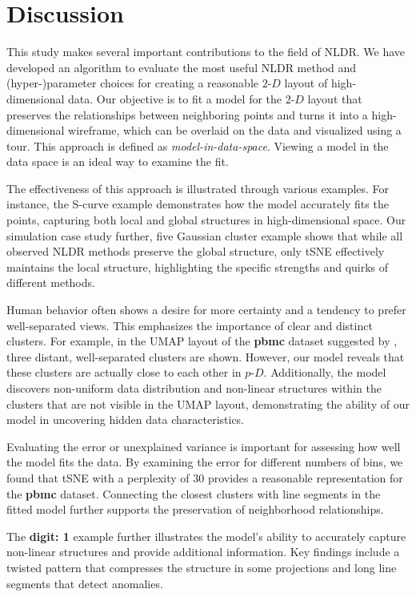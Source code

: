 \documentclass[
  12pt]{article}
\newcommand\pD{$p\text{-}D$}
\newcommand\gD{$2\text{-}D$}
\begin{document}
\section{Discussion}\label{sec-discussion}

This study makes several important contributions to the field of NLDR.
We have developed an algorithm to evaluate the most useful NLDR method
and (hyper-)parameter choices for creating a reasonable \gD{} layout of
high-dimensional data. Our objective is to fit a model for the \gD{}
layout that preserves the relationships between neighboring points and
turns it into a high-dimensional wireframe, which can be overlaid on the
data and visualized using a tour. This approach is defined as
\emph{model-in-data-space}. Viewing a model in the data space is an
ideal way to examine the fit.

The effectiveness of this approach is illustrated through various
examples. For instance, the S-curve example demonstrates how the model
accurately fits the points, capturing both local and global structures
in high-dimensional space. Our simulation case study further, five
Gaussian cluster example shows that while all observed NLDR methods
preserve the global structure, only tSNE effectively maintains the local
structure, highlighting the specific strengths and quirks of different
methods.

Human behavior often shows a desire for more certainty and a tendency to
prefer well-separated views. This emphasizes the importance of clear and
distinct clusters. For example, in the UMAP layout of the \textbf{pbmc}
dataset suggested by \citet{chen2023}, three distant, well-separated
clusters are shown. However, our model reveals that these clusters are
actually close to each other in \pD{}. Additionally, the model discovers
non-uniform data distribution and non-linear structures within the
clusters that are not visible in the UMAP layout, demonstrating the
ability of our model in uncovering hidden data characteristics.

Evaluating the error or unexplained variance is important for assessing
how well the model fits the data. By examining the error for different
numbers of bins, we found that tSNE with a perplexity of \(30\) provides
a reasonable representation for the \textbf{pbmc} dataset. Connecting
the closest clusters with line segments in the fitted model further
supports the preservation of neighborhood relationships.

The \textbf{digit: 1} example further illustrates the model's ability to
accurately capture non-linear structures and provide additional
information. Key findings include a twisted pattern that compresses the
structure in some projections and long line segments that detect
anomalies.
\end{document}
